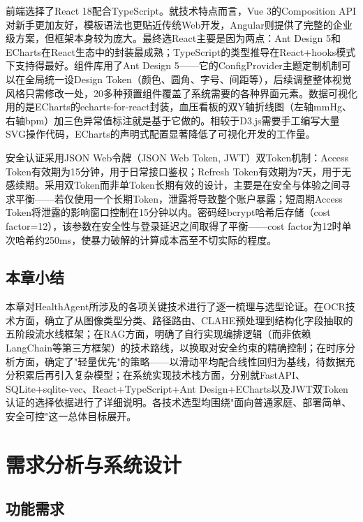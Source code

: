 \documentclass[zihao=-4,a4paper]{ctexart}
\begin{document}
前端选择了React 18配合TypeScript。就技术特点而言，Vue 3的Composition API对新手更加友好，模板语法也更贴近传统Web开发，Angular则提供了完整的企业级方案，但框架本身较为庞大。最终选React主要是因为两点：Ant Design 5和ECharts在React生态中的封装最成熟；TypeScript的类型推导在React+hooks模式下支持得最好。组件库用了Ant Design 5——它的ConfigProvider主题定制机制可以在全局统一设Design Token（颜色、圆角、字号、间距等），后续调整整体视觉风格只需修改一处，20多种预置组件覆盖了系统需要的各种界面元素。数据可视化用的是ECharts的echarts-for-react封装，血压看板的双Y轴折线图（左轴mmHg、右轴bpm）加三色异常值标注就是基于它做的。相较于D3.js需要手工编写大量SVG操作代码，ECharts的声明式配置显著降低了可视化开发的工作量。

安全认证采用JSON Web令牌（JSON Web Token, JWT）双Token机制：Access Token有效期为15分钟，用于日常接口鉴权；Refresh Token有效期为7天，用于无感续期。采用双Token而非单Token长期有效的设计，主要是在安全与体验之间寻求平衡——若仅使用一个长期Token，泄露将导致整个账户暴露；短周期Access Token将泄露的影响窗口控制在15分钟以内。密码经bcrypt哈希后存储（cost factor=12），该参数在安全性与登录延迟之间取得了平衡——cost factor为12时单次哈希约250ms，使暴力破解的计算成本高至不切实际的程度。

\subsection{本章小结}

本章对HealthAgent所涉及的各项关键技术进行了逐一梳理与选型论证。在OCR技术方面，确立了从图像类型分类、路径路由、CLAHE预处理到结构化字段抽取的五阶段流水线框架；在RAG方面，明确了自行实现编排逻辑（而非依赖LangChain等第三方框架）的技术路线，以换取对安全约束的精确控制；在时序分析方面，确定了"轻量优先"的策略——以滑动平均配合线性回归为基线，待数据充分积累后再引入复杂模型；在系统实现技术栈方面，分别就FastAPI、SQLite+sqlite-vec、React+TypeScript+Ant Design+ECharts以及JWT双Token认证的选择依据进行了详细说明。各技术选型均围绕"面向普通家庭、部署简单、安全可控"这一总体目标展开。

\newpage
\section{需求分析与系统设计}

\subsection{功能需求}
\end{document}
